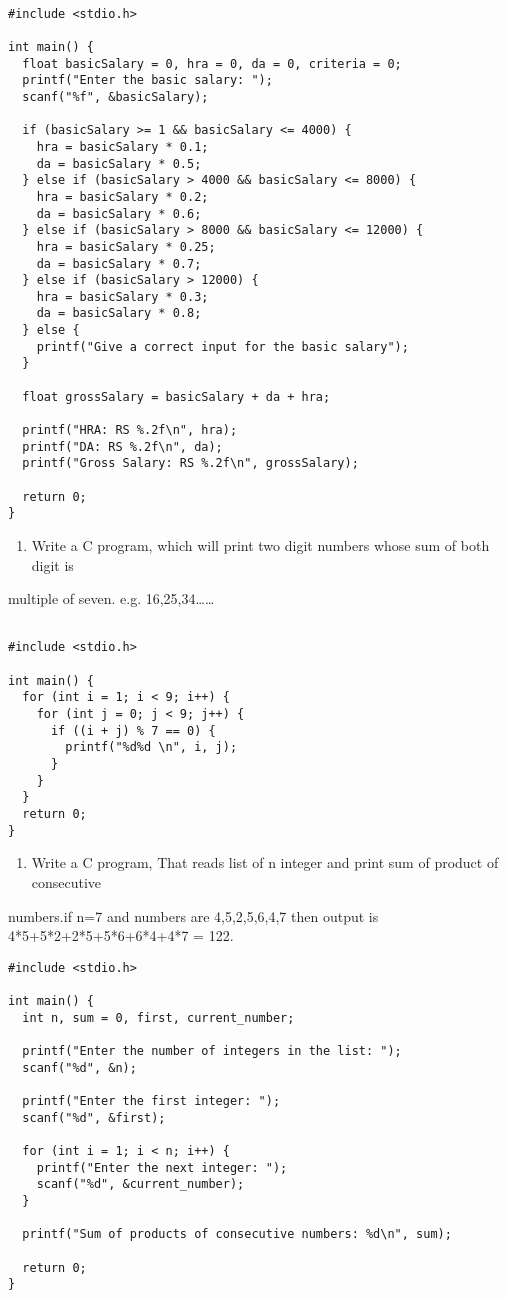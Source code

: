 \documentclass[11pt]{article}
\begin{document}
\begin{verbatim}

#include <stdio.h>

int main() {
  float basicSalary = 0, hra = 0, da = 0, criteria = 0;
  printf("Enter the basic salary: ");
  scanf("%f", &basicSalary);

  if (basicSalary >= 1 && basicSalary <= 4000) {
    hra = basicSalary * 0.1;
    da = basicSalary * 0.5;
  } else if (basicSalary > 4000 && basicSalary <= 8000) {
    hra = basicSalary * 0.2;
    da = basicSalary * 0.6;
  } else if (basicSalary > 8000 && basicSalary <= 12000) {
    hra = basicSalary * 0.25;
    da = basicSalary * 0.7;
  } else if (basicSalary > 12000) {
    hra = basicSalary * 0.3;
    da = basicSalary * 0.8;
  } else {
    printf("Give a correct input for the basic salary");
  }

  float grossSalary = basicSalary + da + hra;

  printf("HRA: RS %.2f\n", hra);
  printf("DA: RS %.2f\n", da);
  printf("Gross Salary: RS %.2f\n", grossSalary);

  return 0;
}

\end{verbatim}


\begin{enumerate}
\item Write a C program, which will print two digit numbers whose sum of both digit is
\end{enumerate}
multiple of seven. e.g. 16,25,34\ldots{}\ldots{} 

\begin{verbatim}

#include <stdio.h>

int main() {
  for (int i = 1; i < 9; i++) {
    for (int j = 0; j < 9; j++) {
      if ((i + j) % 7 == 0) {
        printf("%d%d \n", i, j);
      }
    }
  }
  return 0;
}

\end{verbatim}

\begin{enumerate}
\item Write a C program, That reads list of n integer and print sum of product of consecutive
\end{enumerate}
numbers.if n=7 and numbers are 4,5,2,5,6,4,7
then output is 4*5+5*2+2*5+5*6+6*4+4*7 = 122.

\begin{verbatim}
#include <stdio.h>

int main() {
  int n, sum = 0, first, current_number;

  printf("Enter the number of integers in the list: ");
  scanf("%d", &n);

  printf("Enter the first integer: ");
  scanf("%d", &first);

  for (int i = 1; i < n; i++) {
    printf("Enter the next integer: ");
    scanf("%d", &current_number);
  }

  printf("Sum of products of consecutive numbers: %d\n", sum);

  return 0;
}

\end{verbatim}
\end{document}
